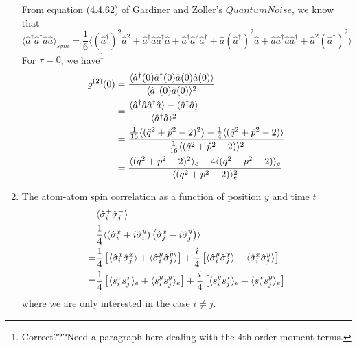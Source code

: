 \documentclass{article}
\begin{document}
\begin{enumerate}
    From equation (4.4.62) of Gardiner and Zoller's $Quantum Noise$, we know that
    \begin{equation}
        \langle \hat{a}^\dagger\hat{a}^\dagger\hat{a}\hat{a} \rangle_{sym} = \frac{1}{6}\langle(\hat{a}^\dagger)^2\hat{a}^2+\hat{a}^\dagger\hat{a}\hat{a}^\dagger\hat{a}+\hat{a}^\dagger\hat{a}^2\hat{a}^\dagger+\hat{a}(\hat{a}^\dagger)^2\hat{a}+\hat{a}\hat{a}^\dagger\hat{a}\hat{a}^\dagger+\hat{a}^2(\hat{a}^\dagger)^2\rangle
    \end{equation}
    For $\tau = 0$, we have\footnote{Correct???Need a paragraph here dealing with the 4th order moment terms.}
    \begin{align}
                \label{g2(0)}
            \notag g^{(2)}(0) &= \frac{\langle \hat{a}^\dagger(0)\hat{a}^\dagger(0) \hat{a}(0)\hat{a}(0) \rangle}{\langle\hat{a}^\dagger(0)\hat{a}(0)\rangle^2 }\\
            \notag &= \frac{\langle \hat{a}^\dagger \hat{a} \hat{a}^\dagger \hat{a} \rangle-\langle\hat{a}^\dagger \hat{a}\rangle}{\langle\hat{a}^\dagger\hat{a}\rangle^2 }\\
             \notag&= \frac{\frac{1}{16} \langle (\hat{q}^2+\hat{p}^2-2)^2\rangle-\frac{1}{4}\langle (\hat{q}^2+\hat{p}^2-2)\rangle}{\frac{1}{16}\langle (\hat{q}^2+\hat{p}^2-2)\rangle^2 }\\
             &= \frac{ \langle (q^2+p^2-2)^2\rangle_e-4\langle (q^2+p^2-2)\rangle_e}{\langle (q^2+p^2-2)\rangle_e^2 }
        \end{align}
    \item The atom-atom spin correlation as a function of position $y$ and time $t$
    \begin{align}
        \notag    &\langle \hat{\sigma}_i^+\hat{\sigma}_j^-\rangle \\
        \notag=   &\frac{1}{4}\langle \left( \hat{\sigma}_i^x+i\hat{\sigma}_i^y\right) \left( \hat{\sigma}_j^x-i\hat{\sigma}_j^y\right)\rangle\\
        \notag=   &\frac{1}{4}\left[\langle \hat{\sigma}_i^x\hat{\sigma}_j^x\rangle+\langle \hat{\sigma}_i^y\hat{\sigma}_j^y\rangle \right]+\frac{i}{4}\left[\langle \hat{\sigma}_i^y\hat{\sigma}_j^x\rangle-\langle \hat{\sigma}_i^x\hat{\sigma}_j^y\rangle \right]\\
       =   &\frac{1}{4}\left[\langle s_i^xs_j^x\rangle_e+\langle s_i^ys_j^y\rangle_e \right]+\frac{i}{4}\left[\langle s_i^ys_j^x\rangle_e-\langle s_i^xs_j^y\rangle_e \right]
    \end{align}
    where we are only interested in the case $i\neq j$.
    

\end{enumerate}
\end{document}
